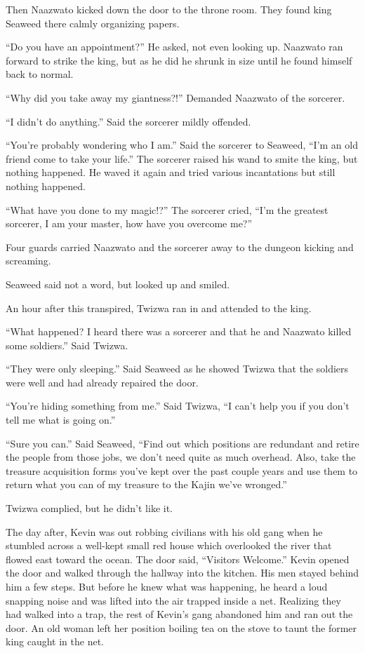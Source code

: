 Then Naa\-zwa\-to kicked down the door to the throne room. They found king Seaweed there calmly organizing papers.

``Do you have an appointment?'' He asked, not even looking up.
Naa\-zwa\-to ran forward to strike the king, but as he did he shrunk in size until he found himself back to normal.

``Why did you take away my giantness?!'' Demanded Naa\-zwa\-to of the sorcerer. 

``I didn't do anything.'' Said the sorcerer mildly offended.

``You're probably wondering who I am.'' Said the sorcerer to Seaweed, ``I'm an old friend come to take your life.''
The sorcerer raised his wand to smite the king, but nothing happened.  
He waved it again and tried various incantations but still nothing happened.

``What have you done to my magic!?''
The sorcerer cried, ``I'm the greatest sorcerer, I am your master, how have you overcome me?''

Four guards carried Naa\-zwa\-to and the sorcerer away to the dungeon kicking and screaming.

Seaweed said not a word, but looked up and smiled.

An hour after this transpired, Twi\-zwa ran in and attended to the king.

``What happened? I heard there was a sorcerer and that he and Naa\-zwa\-to killed some soldiers.'' Said Twi\-zwa.

``They were only sleeping.'' Said Seaweed as he showed Twi\-zwa that the soldiers were well and had already repaired the door.

``You're hiding something from me.'' Said Twi\-zwa, ``I can't help you if you don't tell me what is going on.''

``Sure you can.'' Said Seaweed, ``Find out which positions are redundant and retire the people from those jobs, we don't need quite as much overhead. Also, take the treasure acquisition forms you've kept over the past couple years and use them to return what you can of my treasure to the Ka\-jin we've wronged.''

Twi\-zwa complied, but he didn't like it.

\tbreak

The day after, Kevin was out robbing civilians with his old gang when he stumbled across a well-kept small red house which overlooked the river that flowed east toward the ocean. The door said, ``Visitors Welcome.''
Kevin opened the door and walked through the hallway into the kitchen. His men stayed behind him a few steps.
But before he knew what was happening, he heard a loud snapping noise and was lifted into the air trapped inside a net.
Realizing they had walked into a trap, the rest of Kevin's gang abandoned him and ran out the door. 
An old woman left her position boiling tea on the stove to taunt the former king caught in the net.

